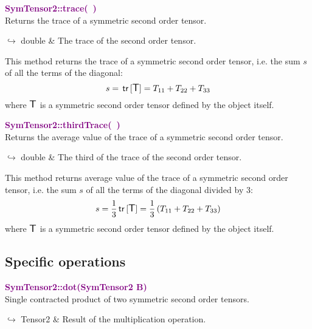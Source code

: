 \textcolor{purple}{\textbf{SymTensor2::trace(~)}}\label{SymTensor2::trace()}\\
Returns the trace of a symmetric second order tensor.\vspace*{-0.5em}
\begin{tcolorbox}[grow to left by=-1cm, width=\textwidth-1cm,myArgs,tabularx={l|R}]
$\hookrightarrow$ double & The trace of the second order tensor.
\end{tcolorbox}

This method returns the trace of a symmetric second order tensor, i.e. the sum $s$ of all the terms of the diagonal:
\begin{equation*}
s = \mbox{\ensuremath{\mathsf{\,tr\,}}}[\mbox{\large\ensuremath{\mathsf{T}}}] = T_{11}+T_{22}+T_{33}
\end{equation*}
where $\mbox{\large\ensuremath{\mathsf{T}}}$ is a symmetric second order tensor defined by the object itself.

\textcolor{purple}{\textbf{SymTensor2::thirdTrace(~)}}\label{SymTensor2::thirdTrace()}\\
Returns the average value of the trace of a symmetric second order tensor.\vspace*{-0.5em}
\begin{tcolorbox}[grow to left by=-1cm, width=\textwidth-1cm,myArgs,tabularx={l|R}]
$\hookrightarrow$ double & The third of the trace of the second order tensor.
\end{tcolorbox}

This method returns average value of the trace of a symmetric second order tensor, i.e. the sum $s$ of all the terms of the diagonal divided by 3:
\begin{equation*}
s = \frac{1}{3} \mbox{\ensuremath{\mathsf{\,tr\,}}}[\mbox{\large\ensuremath{\mathsf{T}}}] =  \frac{1}{3} \left( T_{11}+T_{22}+T_{33} \right)
\end{equation*}
where $\mbox{\large\ensuremath{\mathsf{T}}}$ is a symmetric second order tensor defined by the object itself.

\subsection{Specific operations}

\textcolor{purple}{\textbf{SymTensor2::dot(SymTensor2 B)}}\label{SymTensor2::dot(SymTensor2 B)}\\
Single contracted product of two symmetric second order tensors.\vspace*{-0.5em}
\begin{tcolorbox}[grow to left by=-1cm, width=\textwidth-1cm,myArgs,tabularx={l|R}]
$\hookrightarrow$ Tensor2 & Result of the multiplication operation.
\end{tcolorbox}


